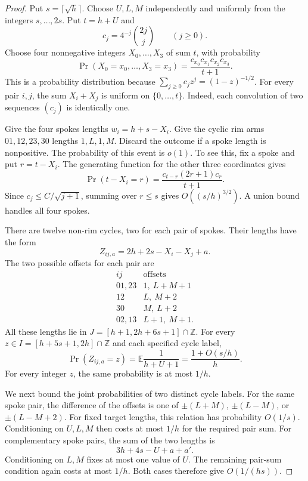 \begin{proof}
Put $s=\lceil\sqrt h\rceil$.
Choose $U,L,M$ independently and uniformly from the integers $s,\ldots,2s$.
Put $t=h+U$ and
\[
 c_j=4^{-j}\binom{2j}{j}\qquad(j\ge0).
\]
Choose four nonnegative integers $X_0,\ldots,X_3$ of sum $t$, with probability
\begin{equation}
 \Pr(X_0=x_0,\ldots,X_3=x_3)
   =\frac{c_{x_0}c_{x_1}c_{x_2}c_{x_3}}{t+1}.
 \label{eq:rhost-wheel-distribution}
\end{equation}
This is a probability distribution because $\sum_{j\ge0}c_jz^j=(1-z)^{-1/2}$.
For every pair $i,j$, the sum $X_i+X_j$ is uniform on $\{0,\ldots,t\}$.
Indeed, each convolution of two sequences $(c_j)$ is identically one.

Give the four spokes lengths $w_i=h+s-X_i$.
Give the cyclic rim arms $01,12,23,30$ lengths $1,L,1,M$.
Discard the outcome if a spoke length is nonpositive.
The probability of this event is $o(1)$.
To see this, fix a spoke and put $r=t-X_i$.
The generating function for the other three coordinates gives
\[
 \Pr(t-X_i=r)=\frac{c_{t-r}(2r+1)c_r}{t+1}.
\]
Since $c_j\le C/\sqrt{j+1}$, summing over $r\le s$ gives $O((s/h)^{3/2})$.
A union bound handles all four spokes.

There are twelve non-rim cycles, two for each pair of spokes.
Their lengths have the form
\[
 Z_{ij,a}=2h+2s-X_i-X_j+a.
\]
The two possible offsets for each pair are
\[
\begin{array}{c|c}
 ij&\text{offsets}\\\hline
 01,23&1,\ L+M+1\\
 12&L,\ M+2\\
 30&M,\ L+2\\
 02,13&L+1,\ M+1.
\end{array}
\]
All these lengths lie in
$J=[h+1,2h+6s+1]\cap\mathbb Z$.
For every $z\in I=[h+5s+1,2h]\cap\mathbb Z$ and each specified cycle label,
\begin{equation}
 \Pr(Z_{ij,a}=z)=\mathbb E\frac1{h+U+1}
                  =\frac{1+O(s/h)}h.
 \label{eq:rhost-wheel-marginal}
\end{equation}
For every integer $z$, the same probability is at most $1/h$.

We next bound the joint probabilities of two distinct cycle labels.
For the same spoke pair, the difference of the offsets is one of
$\pm(L+M)$, $\pm(L-M)$, or $\pm(L-M+2)$.
For fixed target lengths, this relation has probability $O(1/s)$.
Conditioning on $U,L,M$ then costs at most $1/h$ for the required pair sum.
For complementary spoke pairs, the sum of the two lengths is
\[
 3h+4s-U+a+a'.
\]
Conditioning on $L,M$ fixes at most one value of $U$.
The remaining pair-sum condition again costs at most $1/h$.
Both cases therefore give $O(1/(hs))$.


\end{proof}
